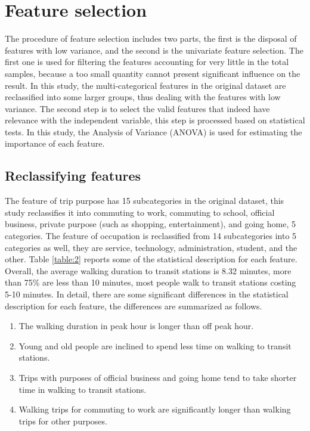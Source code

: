 \documentclass[Journal,letterpaper]{ascelike-new}
\begin{document}
%
\section{Feature selection}
The procedure of feature selection includes two parts, the first is the disposal of features with low variance, and the second is the univariate feature selection. The first one is used for filtering the features accounting for very little in the total samples, because a too small quantity cannot present significant influence on the result. In this study, the multi-categorical features in the original dataset are reclassified into some larger groups, thus dealing with the features with low variance. The second step is to select the valid features that indeed have relevance with the independent variable, this step is processed based on statistical tests. In this study, the Analysis of Variance (ANOVA) is used for estimating the importance of each feature.

%
\subsection{Reclassifying features}
The feature of trip purpose has 15 subcategories in the original dataset, this study reclassifies it into commuting to work, commuting to school, official business, private purpose (such as shopping, entertainment), and going home, 5 categories. The feature of occupation is reclassified from 14 subcategories into 5 categories as well, they are service, technology, administration, student, and the other. Table \ref{table:2} reports some of the statistical description for each feature. Overall, the average walking duration to transit stations is 8.32 minutes, more than 75\% are less than 10 minutes, most people walk to transit stations costing 5-10 minutes. In detail, there are some significant differences in the statistical description for each feature, the differences are summarized as follows.

%
\begin{enumerate}
    \item The walking duration in peak hour is longer than off peak hour.
    \item Young and old people are inclined to spend less time on walking to transit stations.
    \item Trips with purposes of official business and going home tend to take shorter time in walking to transit stations.
    \item Walking trips for commuting to work are significantly longer than walking trips for other purposes.
\end{enumerate}
\end{document}
